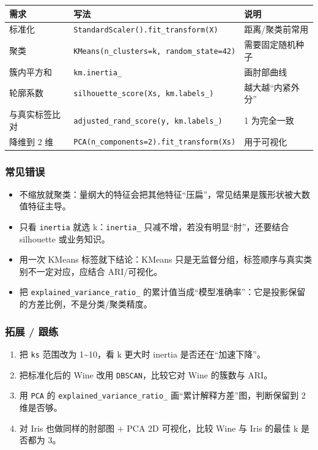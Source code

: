 {\def\LTcaptype{none} %
\begin{longtable}[]{@{}lll@{}}
\toprule\noalign{}
需求 & 写法 & 说明 \\
\midrule\noalign{}
\endhead
\bottomrule\noalign{}
\endlastfoot
标准化 & \texttt{StandardScaler().fit\_transform(X)} &
距离/聚类前常用 \\
聚类 & \texttt{KMeans(n\_clusters=k,\ random\_state=42)} &
需要固定随机种子 \\
簇内平方和 & \texttt{km.inertia\_} & 画肘部曲线 \\
轮廓系数 & \texttt{silhouette\_score(Xs,\ km.labels\_)} &
越大越``内紧外分'' \\
与真实标签比对 & \texttt{adjusted\_rand\_score(y,\ km.labels\_)} & 1
为完全一致 \\
降维到 2 维 & \texttt{PCA(n\_components=2).fit\_transform(Xs)} &
用于可视化 \\
\end{longtable}
}

\subsubsection{常见错误}\label{ux5e38ux89c1ux9519ux8bef-33}

\begin{itemize}
\tightlist
\item
  不缩放就聚类：量纲大的特征会把其他特征``压扁''，常见结果是簇形状被大数值特征主导。
\item
  只看 \texttt{inertia} 就选 k：\texttt{inertia\_}
  只减不增，若没有明显``肘''，还要结合 silhouette 或业务知识。
\item
  用一次 KMeans 标签就下结论：KMeans
  只是无监督分组，标签顺序与真实类别不一定对应，应结合 ARI/可视化。
\item
  把 \texttt{explained\_variance\_ratio\_}
  的累计值当成``模型准确率''：它是投影保留的方差比例，不是分类/聚类精度。
\end{itemize}

\subsubsection{拓展 / 跟练}\label{ux62d3ux5c55-ux8ddfux7ec3-21}

\begin{enumerate}
\def\labelenumi{\arabic{enumi}.}
\tightlist
\item
  把 \texttt{ks} 范围改为 1\textasciitilde10，看 k 更大时 inertia
  是否还在``加速下降''。
\item
  把标准化后的 Wine 改用 \texttt{DBSCAN}，比较它对 Wine 的簇数与 ARI。
\item
  用 \texttt{PCA} 的 \texttt{explained\_variance\_ratio\_}
  画``累计解释方差''图，判断保留到 2 维是否够。
\item
  对 Iris 也做同样的肘部图 + PCA 2D 可视化，比较 Wine 与 Iris 的最佳 k
  是否都为 3。
\end{enumerate}

